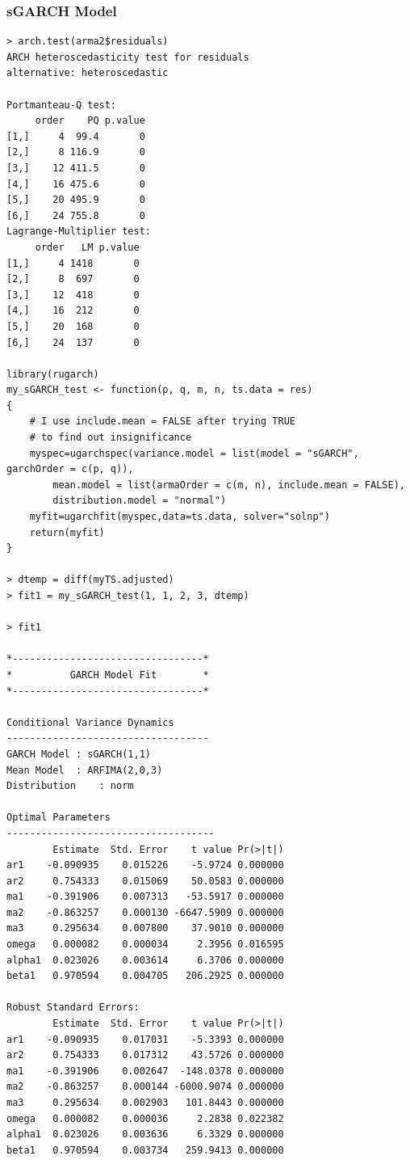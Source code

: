 \documentclass[a4paper,11pt]{article}
\begin{document}
\subsubsection{sGARCH Model}
\begin{verbatim}
> arch.test(arma2$residuals)
ARCH heteroscedasticity test for residuals 
alternative: heteroscedastic 

Portmanteau-Q test: 
     order    PQ p.value
[1,]     4  99.4       0
[2,]     8 116.9       0
[3,]    12 411.5       0
[4,]    16 475.6       0
[5,]    20 495.9       0
[6,]    24 755.8       0
Lagrange-Multiplier test: 
     order   LM p.value
[1,]     4 1418       0
[2,]     8  697       0
[3,]    12  418       0
[4,]    16  212       0
[5,]    20  168       0
[6,]    24  137       0

library(rugarch)
my_sGARCH_test <- function(p, q, m, n, ts.data = res)
{
	# I use include.mean = FALSE after trying TRUE
	# to find out insignificance
    myspec=ugarchspec(variance.model = list(model = "sGARCH", garchOrder = c(p, q)), 
    	mean.model = list(armaOrder = c(m, n), include.mean = FALSE), 
    	distribution.model = "normal")
    myfit=ugarchfit(myspec,data=ts.data, solver="solnp")
    return(myfit)  
}

> dtemp = diff(myTS.adjusted)
> fit1 = my_sGARCH_test(1, 1, 2, 3, dtemp)

> fit1

*---------------------------------*
*          GARCH Model Fit        *
*---------------------------------*

Conditional Variance Dynamics 	
-----------------------------------
GARCH Model	: sGARCH(1,1)
Mean Model	: ARFIMA(2,0,3)
Distribution	: norm 

Optimal Parameters
------------------------------------
        Estimate  Std. Error    t value Pr(>|t|)
ar1    -0.090935    0.015226    -5.9724 0.000000
ar2     0.754333    0.015069    50.0583 0.000000
ma1    -0.391906    0.007313   -53.5917 0.000000
ma2    -0.863257    0.000130 -6647.5909 0.000000
ma3     0.295634    0.007800    37.9010 0.000000
omega   0.000082    0.000034     2.3956 0.016595
alpha1  0.023026    0.003614     6.3706 0.000000
beta1   0.970594    0.004705   206.2925 0.000000

Robust Standard Errors:
        Estimate  Std. Error    t value Pr(>|t|)
ar1    -0.090935    0.017031    -5.3393 0.000000
ar2     0.754333    0.017312    43.5726 0.000000
ma1    -0.391906    0.002647  -148.0378 0.000000
ma2    -0.863257    0.000144 -6000.9074 0.000000
ma3     0.295634    0.002903   101.8443 0.000000
omega   0.000082    0.000036     2.2838 0.022382
alpha1  0.023026    0.003636     6.3329 0.000000
beta1   0.970594    0.003734   259.9413 0.000000


\end{verbatim}
\end{document}
